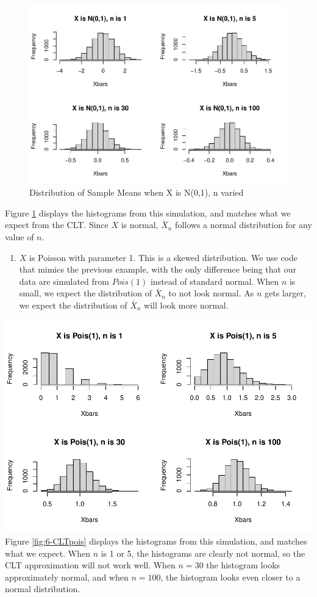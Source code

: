 \documentclass[
]{book}
\providecommand{\tightlist}{%
  \setlength{\itemsep}{0pt}\setlength{\parskip}{0pt}}
\begin{document}
\begin{figure}
\centering
\includegraphics{bookdown-demo_files/figure-latex/6-CLTnorm-1.pdf}
\caption{\label{fig:6-CLTnorm}Distribution of Sample Means when X is N(0,1), n varied}
\end{figure}

Figure \ref{fig:6-CLTnorm} displays the histograms from this simulation, and matches what we expect from the CLT. Since \(X\) is normal, \(\bar{X}_n\) follows a normal distribution for any value of \(n\).

\begin{enumerate}
\def\labelenumi{\arabic{enumi}.}
\setcounter{enumi}{1}
\tightlist
\item
  \(X\) is Poisson with parameter 1. This is a skewed distribution. We use code that mimics the previous example, with the only difference being that our data are simulated from \(Pois(1)\) instead of standard normal. When \(n\) is small, we expect the distribution of \(\bar{X}_n\) to not look normal. As \(n\) gets larger, we expect the distribution of \(\bar{X}_n\) will look more normal.
\end{enumerate}

\includegraphics{bookdown-demo_files/figure-latex/6-CLTpois-1.pdf}
Figure \ref{fig:6-CLTpois} displays the histograms from this simulation, and matches what we expect. When \(n\) is 1 or 5, the histograms are clearly not normal, so the CLT approximation will not work well. When \(n=30\) the histogram looks approximately normal, and when \(n=100\), the histogram looks even closer to a normal distribution.
\end{document}
